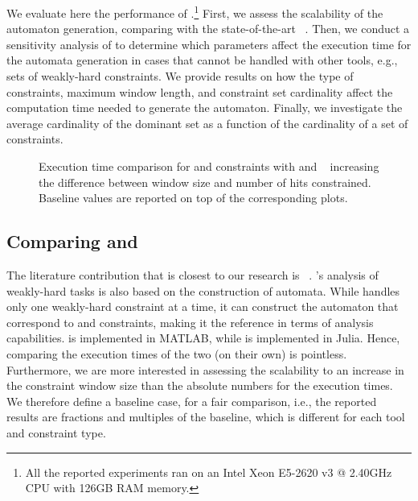 We evaluate here the performance of \tool{}.\footnote{All the reported experiments ran on an Intel Xeon E5-2620 v3 @ 2.40GHz CPU with 126GB RAM memory.}
First, we assess the scalability of the automaton generation, comparing \tool{} with the state-of-the-art \toolLinsenmayer{}~\cite{Linsenmayer:2017, Linsenmayer:2021}.
Then, we conduct a sensitivity analysis of \tool{} to determine which parameters affect the execution time for the automata generation in cases that cannot be handled with other tools, e.g., sets of weakly-hard constraints.
We provide results on how the type of constraints, maximum window length, and constraint set cardinality affect the computation time needed to generate the automaton.
Finally, we investigate the average cardinality of the dominant set as a function of the cardinality of a set of constraints.

\begin{figure*}[t]
    
    \caption{Execution time comparison for \tAH{} and \tRH{} constraints with \tool{} and \toolLinsenmayer{}~\cite{Linsenmayer:2017} increasing the difference between window size and number of hits constrained.
        Baseline values are reported on top of the corresponding plots.}
    \label{fig:timing}
\end{figure*}

\subsection{Comparing \tool{} and \toolLinsenmayer{}}%
\label{sec:comparative_evaluation}%

The literature contribution that is closest to our research is \toolLinsenmayer{}~\cite{Linsenmayer:2017, Linsenmayer:2021}.
\toolLinsenmayer{}'s analysis of weakly-hard tasks is also based on the construction of automata.
While \toolLinsenmayer{} handles only one weakly-hard constraint at a time, it can construct the automaton that correspond to \tAH{} and \tRH{} constraints, making it the reference in terms of analysis capabilities.
\toolLinsenmayer{} is implemented in MATLAB, while \tool{} is implemented in Julia.
Hence, comparing the execution times of the two (on their own) is pointless.
Furthermore, we are more interested in assessing the scalability to an increase in the constraint window size than the absolute numbers for the execution times.
We therefore define a baseline case, for a fair comparison, i.e., the reported results are fractions and multiples of the baseline, which is different for each tool and constraint type.

